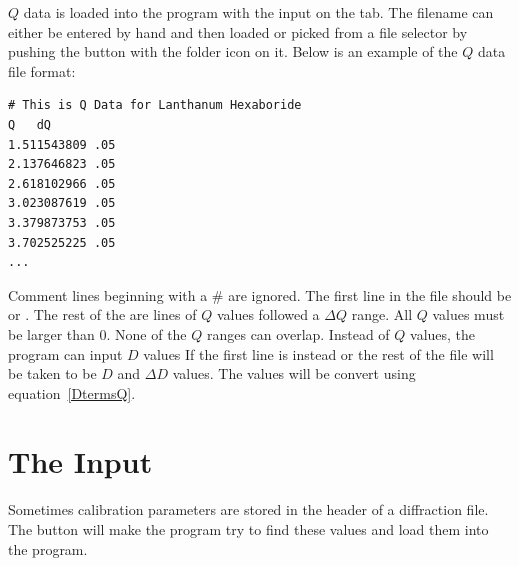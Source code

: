 $Q$ data is loaded into the program with the 
input on the  tab. The filename can either 
be entered by hand and then loaded or picked from a file selector 
by pushing the button with the folder icon on it.  Below is an example 
of the $Q$ data file format: 
\begin{lstlisting}
# This is Q Data for Lanthanum Hexaboride
Q   dQ
1.511543809 .05
2.137646823 .05
2.618102966 .05
3.023087619 .05
3.379873753 .05
3.702525225 .05
...
\end{lstlisting}
Comment lines beginning with a \# are ignored. The
first line in the file should be  or 
. The 
rest of the are lines of $Q$ values followed a $\Delta Q$ range.
All $Q$ values must be larger than 0. None of the $Q$ ranges can 
overlap. Instead of $Q$ values, the program can input $D$ values 
If the first line is instead  or  the rest of 
the file will be taken to be $D$ and $\Delta D$ values.
The values will be convert using equation~\ref{DtermsQ}. 

\section{\texorpdfstring{The  Input}
    {The ''Get From Header Input''}}

Sometimes calibration parameters are stored in the header of
a diffraction file.  The  button will 
make the program try to find these values and load them into the 
program.
